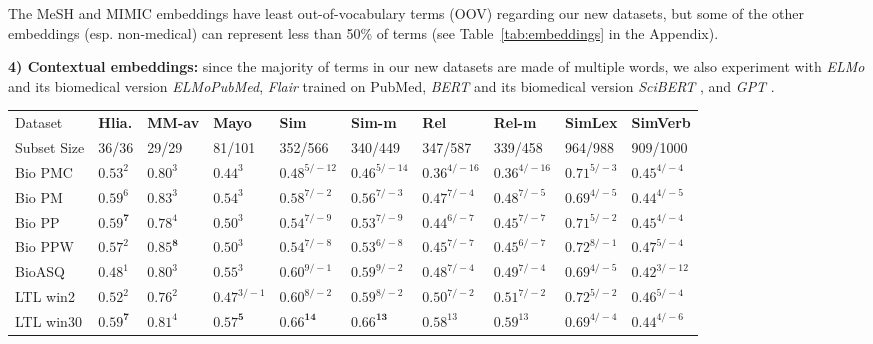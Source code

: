 \documentclass[letterpaper]{article} %
\begin{document}
The MeSH and MIMIC embeddings have least out-of-vocabulary terms (OOV) regarding our new datasets, but some of the other embeddings (esp. non-medical) can represent less than 50\% of terms (see Table~\ref{tab:embeddings} in the Appendix).

\noindent \textbf{4) Contextual embeddings:} since the majority of terms in our new datasets are made of multiple words, we also experiment with 
\emph{ELMo} \cite{peters-etal-2018-deep} and its biomedical version \emph{ELMoPubMed}, \emph{Flair} \cite{akbik2019naacl} trained on PubMed, \emph{BERT}  \cite{DBLP:journals/corr/abs-1810-04805} and its biomedical version \emph{SciBERT} \cite{Beltagy2019SciBERT}, and \emph{GPT} \cite{Radford2018ImprovingLU}.

\begin{table*}[th]
    \centering
    \small
    \begin{tabular}{l l l l l l l l l l}
         Dataset & \textbf{Hlia.} & \textbf{MM-av} & \textbf{Mayo} & \textbf{Sim} & \textbf{Sim-m} & \textbf{Rel} & \textbf{Rel-m} & \textbf{SimLex} & \textbf{SimVerb}\\ 
         Subset Size & 36/36 & 29/29 & 81/101 & 352/566 & 340/449 & 347/587 & 339/458 & 964/988 & 909/1000\\
         \midrule
Bio PMC & $0.53^{2}$ & $0.80^{3}$ & $0.44^{3}$ & $0.48^{5/-12}$ & $0.46^{5/-14}$ & $0.36^{4/-16}$ & $0.36^{4/-16}$ & $0.71^{5/-3}$ & $0.45^{4/-4}$ \\
Bio PM & $0.59^{6}$ & $0.83^{3}$ & $0.54^{3}$ & $0.58^{7/-2}$ & $0.56^{7/-3}$ & $0.47^{7/-4}$ & $0.48^{7/-5}$ & $0.69^{4/-5}$ & $0.44^{4/-5}$ \\
Bio PP & $\mathbf{0.59^{7}}$ & $0.78^{4}$ & $0.50^{3}$ & $0.54^{7/-9}$ & $0.53^{7/-9}$ & $0.44^{6/-7}$ & $0.45^{7/-7}$ & $0.71^{5/-2}$ & $0.45^{4/-4}$ \\
Bio PPW & $0.57^{2}$ & $\mathbf{0.85^{8}}$ & $0.50^{3}$ & $0.54^{7/-8}$ & $0.53^{6/-8}$ & $0.45^{7/-7}$ & $0.45^{6/-7}$ & $0.72^{8/-1}$ & $0.47^{5/-4}$ \\
BioASQ & $0.48^{1}$ & $0.80^{3}$ & $0.55^{3}$ & $0.60^{9/-1}$ & $0.59^{9/-2}$ & $0.48^{7/-4}$ & $0.49^{7/-4}$ & $0.69^{4/-5}$ & $0.42^{3/-12}$ \\
LTL win2 & $0.52^{2}$ & $0.76^{2}$ & $0.47^{3/-1}$ & $0.60^{8/-2}$ & $0.59^{8/-2}$ & $0.50^{7/-2}$ & $0.51^{7/-2}$ & $0.72^{5/-2}$ & $0.46^{5/-4}$ \\
LTL win30 & $\mathbf{0.59^{7}}$ & $0.81^{4}$ & $\mathbf{0.57^{5}}$ & $\mathbf{0.66^{14}}$ & $\mathbf{0.66^{13}}$ & $0.58^{13}$ & $0.59^{13}$ & $0.69^{4/-4}$ & $0.44^{4/-6}$ \\

\end{tabular}
\end{table*}
\end{document}
